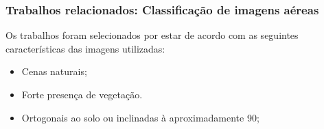 \documentclass[t]{beamer}
\begin{document}
%
%
%
%
%
%

\begin{frame}[c]
	\frametitle{Trabalhos relacionados: Classificação de imagens aéreas}

	Os trabalhos foram selecionados por estar de acordo com as seguintes características das imagens utilizadas:

	\begin{itemize}
		\item Cenas naturais;
		\item Forte presença de vegetação.
 		\item Ortogonais ao solo ou inclinadas à aproximadamente 90\degree;
	\end{itemize}
\end{frame}
\end{document}
